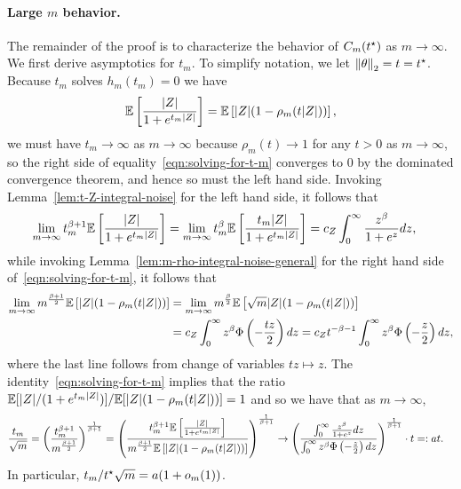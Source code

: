 \paragraph{Large $m$ behavior.} The remainder of the
proof is to characterize the behavior of $C_m(t^\star)$ as $m\to\infty$.
We first derive asymptotics for $t_m$. To simplify notation, we let
$\left\|{\theta}\right\|_2 = t = t^\star$. Because $t_m$ solves $h_m(t_m) = 0$ we have
\begin{align}
  \mathbb{E} \left[{\frac{|Z|}{1 + e^{t_m|Z|}}}\right] = \mathbb{E} \left[{|Z|(1-\rho_m(t |Z|))}\right],
  \label{eqn:solving-for-t-m}
\end{align}
we must have $t_m \to \infty$ as $m \to \infty$ because $\rho_m(t) \to 1$
for any $t > 0$ as $m \to \infty$, so the right side of
equality~\eqref{eqn:solving-for-t-m} converges to 0 by the dominated
convergence theorem, and hence so must the left hand side.  Invoking
Lemma~\ref{lem:t-Z-integral-noise} for the left hand side, it follows that
\begin{align*}
  \lim_{m \to \infty} t_m^{\beta + 1} \Ep \brk{\frac{|Z|}{1 + e^{t_m|Z|}}} & = \lim_{m \to \infty} t_m^{\beta} \Ep \brk{\frac{t_m|Z|}{1 + e^{t_m|Z|}}}  =  c_Z \int_{0}^{\infty} \frac{z^\beta}{1 + e^{z}} dz, %
\end{align*}
while invoking Lemma~\ref{lem:m-rho-integral-noise-general} for the right
hand side of~\eqref{eqn:solving-for-t-m}, it follows that
\begin{align*}
  \lim_{m \to \infty} m^{\frac{\beta+1}{2}}\Ep \brk{|Z|(1-\rho_m(t  |Z|))} & = \lim_{m \to \infty} m^{\frac{\beta}{2}} \Ep \brk{\sqrt m|Z|(1-\rho_m(t  |Z|))} \nonumber \\
  &  = c_Z \int_0^\infty z^\beta \Phi \left(-\frac{tz}{2}\right) dz = c_Z {t}^{-\beta-1}\int_0^\infty z^\beta \Phi \left(-\frac{z}{2}\right) dz, %
\end{align*}
where the last line follows from change of variables $tz \mapsto z$. The
identity~\eqref{eqn:solving-for-t-m}
implies that the ratio $\mathbb{E} [|Z|/(1 + e^{t_m|Z|})] / \mathbb{E} [|Z|(1-\rho_m(t
  |Z|))] = 1$ and so we have that as $m \to \infty$,
\begin{align*}
		\frac{t_m}{\sqrt{m}} & = \left(\frac{	t_m^{\beta + 1}}{ m^{\frac{\beta+1}{2}}}\right)^{\frac{1}{\beta +1}} =  \left(\frac{	t_m^{\beta + 1}\mathbb{E} \left[{\frac{|Z|}{1 + e^{t_m|Z|}}}\right]}{ m^{\frac{\beta+1}{2}} \mathbb{E} \left[{|Z|(1-\rho_m(t |Z|))}\right] }\right)^{\frac{1}{\beta +1}}  \to  \left(\frac{\int_{0}^{\infty} \frac{z^\beta}{1 + e^{z}} dz}{\int_0^\infty z^\beta \Phi \left(-\frac{z}{2}\right) dz}\right)^{\frac{1}{\beta +1}} \cdot t= : a t .  \label{eq:Cm-asymp-noise-tm}
\end{align*}
In particular, $t_m / t^\star \sqrt{m} = a(1 + o_m(1))$.

